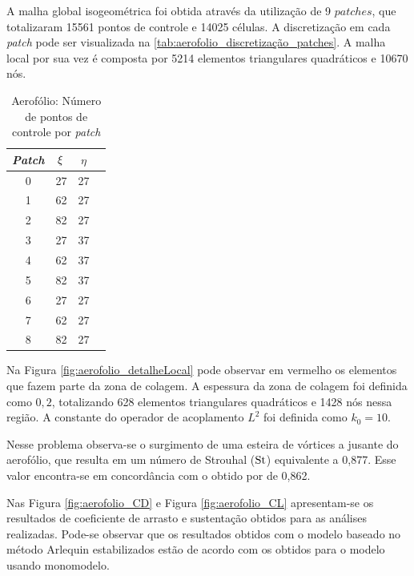A malha global isogeométrica foi obtida através da utilização de 9 $patches$, que totalizaram 15561 pontos de controle e 14025 células. A discretização em cada \textit{patch} pode ser visualizada na \autoref{tab:aerofolio_discretização_patches}. A malha local por sua vez é composta por 5214 elementos triangulares quadráticos e 10670 nós. 

\begin{table}[h]
	\caption{Aerofólio: Número de pontos de controle por \textit{patch}}
	\label{tab:aerofolio_discretização_patches}
	\centering
	\begin{minipage}{0.49\textwidth}
		\centering
		\begin{tabular}{cccc} 
			\toprule
			\textit{Patch} & $\xi$ & $\eta$\\ 
			\midrule \midrule
			0 & 27 & 27\\
			\midrule
			1 & 62 & 27\\
			\midrule
			2 & 82 & 27\\
			\midrule
			3 & 27 & 37\\
			\midrule
			4 & 62 & 37\\
			\midrule
			5 & 82 & 37\\ 
			\midrule
			6 & 27 & 27\\ 
			\midrule
			7 & 62 & 27\\ 
			\midrule
			8 & 82 & 27\\ 
			\bottomrule
		\end{tabular}
	\end{minipage}%
\end{table}

Na Figura \ref{fig:aerofolio_detalheLocal} pode observar em vermelho os elementos que fazem parte da zona de colagem. A espessura da zona de colagem foi definida como $0,2$, totalizando 628 elementos triangulares quadráticos e 1428 nós nessa região. A constante do operador de acoplamento $L^{2}$ foi definida como $k_{0} = 10$. 

Nesse problema observa-se o surgimento de uma esteira de vórtices a jusante do aerofólio, que resulta em um número de Strouhal ($\mathrm{St}$) equivalente a 0,877. Esse valor encontra-se em concordância com o obtido por  de 0,862. 

Nas Figura \ref{fig:aerofolio_CD} e Figura \ref{fig:aerofolio_CL} apresentam-se os resultados de coeficiente de arrasto e sustentação obtidos para as análises realizadas. Pode-se observar que os resultados obtidos com o modelo baseado no método Arlequin estabilizados estão de acordo com os obtidos para o modelo usando monomodelo.

